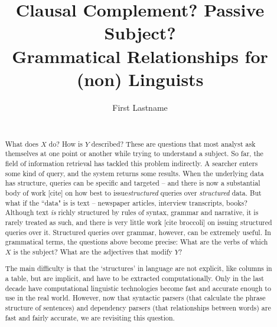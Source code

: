\documentclass{sig-alternate}
\begin{document}
\title{Clausal Complement? Passive Subject?\\Grammatical Relationships for (non) Linguists}

\author{%
\alignauthor First Lastname\\
\\
}

\maketitle

\begin{abstract}
What does $X$ do? How is $Y$ described? These are questions that most analyst ask themselves at one point or another while trying to understand a subject. So far, the field of information retrieval has tackled this problem indirectly. A searcher enters some kind of query, and the system returns some results. When the underlying data has structure, queries can be specific and targeted -- and there is now a substantial body of work [cite] on how best to issue\emph{structured} queries over \emph{structured} data. But what if the  ``data" is is text -- newspaper articles, interview transcripts, books? Although text \emph{is} richly structured by rules of syntax, grammar and narrative, it is rarely treated as such, and there is very little work [cite broccoli] on issuing structured queries over it. Structured queries over grammar, however, can be extremely useful. In grammatical terms, the questions above become precise: What are the verbs of which $X$ is the subject? What are the adjectives that modify $Y$? 

The main difficulty is that the `structures' in language are not explicit, like columns in a table, but are implicit, and have to be extracted computationally.  Only in the last decade have computational linguistic technologies become fast and accurate enough to use in the real world. However, now that syntactic parsers (that calculate the phrase structure of sentences) and dependency parsers (that relationships between words) are fast and fairly accurate, we are revisiting this question.


\end{abstract}



\end{document}
